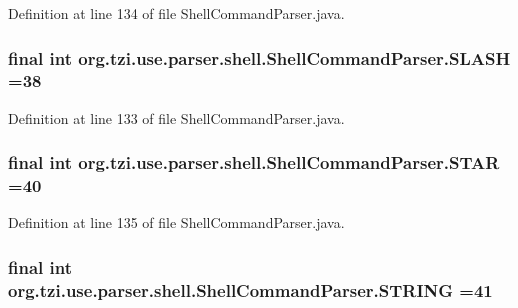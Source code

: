 Definition at line 134 of file Shell\-Command\-Parser.\-java.

\hypertarget{classorg_1_1tzi_1_1use_1_1parser_1_1shell_1_1_shell_command_parser_afa9e2f4114360f820d8d478aa85abd10}{
\subsubsection[{S\-L\-A\-S\-H}]{\setlength{\rightskip}{0pt plus 5cm}final int org.\-tzi.\-use.\-parser.\-shell.\-Shell\-Command\-Parser.\-S\-L\-A\-S\-H =38\hspace{0.3cm}{\ttfamily [static]}}}\label{classorg_1_1tzi_1_1use_1_1parser_1_1shell_1_1_shell_command_parser_afa9e2f4114360f820d8d478aa85abd10}


Definition at line 133 of file Shell\-Command\-Parser.\-java.

\hypertarget{classorg_1_1tzi_1_1use_1_1parser_1_1shell_1_1_shell_command_parser_acb85303c7373f87c7469715cb4bd6f15}{
\subsubsection[{S\-T\-A\-R}]{\setlength{\rightskip}{0pt plus 5cm}final int org.\-tzi.\-use.\-parser.\-shell.\-Shell\-Command\-Parser.\-S\-T\-A\-R =40\hspace{0.3cm}{\ttfamily [static]}}}\label{classorg_1_1tzi_1_1use_1_1parser_1_1shell_1_1_shell_command_parser_acb85303c7373f87c7469715cb4bd6f15}


Definition at line 135 of file Shell\-Command\-Parser.\-java.

\hypertarget{classorg_1_1tzi_1_1use_1_1parser_1_1shell_1_1_shell_command_parser_a70f508f209903ea40e4a4db856532fbb}{
\subsubsection[{S\-T\-R\-I\-N\-G}]{\setlength{\rightskip}{0pt plus 5cm}final int org.\-tzi.\-use.\-parser.\-shell.\-Shell\-Command\-Parser.\-S\-T\-R\-I\-N\-G =41\hspace{0.3cm}{\ttfamily [static]}}}\label{classorg_1_1tzi_1_1use_1_1parser_1_1shell_1_1_shell_command_parser_a70f508f209903ea40e4a4db856532fbb}


